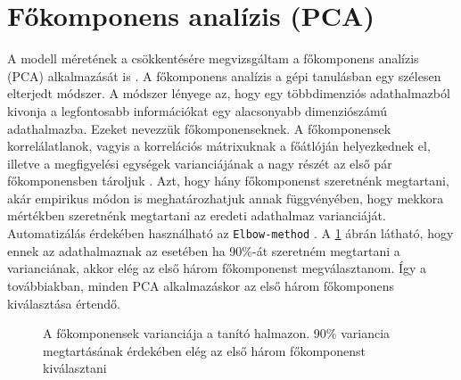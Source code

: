 \section{Főkomponens analízis (PCA)}
\label{ch:pca-methodology}

A modell méretének a csökkentésére megvizsgáltam a főkomponens analízis (PCA) alkalmazását is \cite{pca2010}. A főkomponens analízis a gépi tanulásban egy szélesen elterjedt módszer.  A módszer lényege az, hogy egy többdimenziós adathalmazból kivonja a legfontosabb információkat egy alacsonyabb dimenziószámú adathalmazba. Ezeket nevezzük főkomponenseknek. A főkomponensek korrelálatlanok, vagyis a korrelációs mátrixuknak a főátlóján helyezkednek el, illetve a megfigyelési egységek varianciájának a nagy részét az első pár főkomponensben tároljuk \cite{elek2011}. Azt, hogy hány főkomponenst szeretnénk megtartani, akár empirikus módon is meghatározhatjuk annak függvényében, hogy mekkora mértékben szeretnénk megtartani az eredeti adathalmaz varianciáját. Automatizálás érdekében használható az \texttt{Elbow-method} \cite{elbow2024}. A \ref{fig:pca-variance} ábrán látható, hogy ennek az adathalmaznak az esetében ha 90\%-át szeretném megtartani a varianciának, akkor elég az első három főkomponenst megválasztanom. Így a továbbiakban, minden PCA alkalmazáskor az első három főkomponens kiválasztása értendő.

\varianceretention

\begin{figure}
    \caption{A főkomponensek varianciája a tanító halmazon. 90\% variancia megtartásának érdekében elég az első három főkomponenst kiválasztani}
    \label{fig:pca-variance}
\end{figure}

